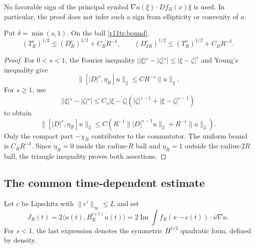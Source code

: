 No favorable sign of the principal symbol
$\nabla a(\xi)\cdot Df_R(x)\xi$ is used. In particular, the proof
does not infer such a sign from ellipticity or convexity of $a$.

\begin{lemma}
\label{lem:r11tr-tail-equivalence}
Put $\delta=\min(s,1)$. On the ball \eqref{r11tr:bound},
\begin{equation}\label{r11tr:tail-equivalence}
 (T_R^c)^{1/2}\le(D_R^c)^{1/2}+C_BR^{-\delta},\qquad
 (D_{2R}^c)^{1/2}\le(T_R^c)^{1/2}+C_BR^{-\delta}.
\end{equation}
\end{lemma}
\begin{proof}
For $0<s<1$, the Fourier inequality
$||\xi|^s-|\zeta|^s|\le|\xi-\zeta|^s$ and Young's inequality give
\[
 \|[|D|^s,\eta_R]u\|_2\le CR^{-s}\|u\|_2.
\]
For $s\ge1$, use
\[
 ||\xi|^s-|\zeta|^s|
 \le C_s|\xi-\zeta|
             (|\zeta|^{s-1}+|\xi-\zeta|^{s-1})
\]
to obtain
\[
 \|[|D|^s,\eta_R]u\|_2
 \le C\left(R^{-1}\||D|^{s-1}u\|_2+R^{-s}\|u\|_2\right).
\]
Only the compact part $-\chi_R$ contributes to the commutator.
The uniform bound is $C_BR^{-\delta}$. Since $\eta_R=0$ inside
the radius-$R$ ball and $\eta_R=1$ outside the radius-$2R$ ball,
the triangle inequality proves both assertions.
\end{proof}

\subsection{The common time-dependent estimate}
Let $c$ be Lipschitz with $\|c'\|_\infty\le L$ and set
\begin{equation}\label{r11tr:virial}
 J_R(t)=2\langle u(t),B_R^{c(t)}u(t)\rangle
 =2\operatorname{Im}\int f_R(x-c(t))\cdot\overline u\nabla u.
\end{equation}
For $s<1$, the last expression denotes the symmetric $H^{1/2}$
quadratic form, defined by density.

